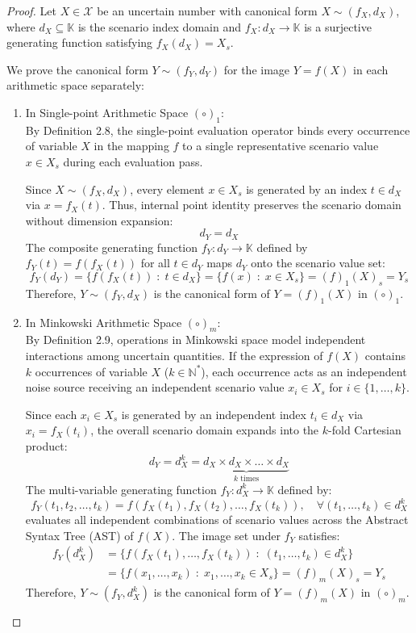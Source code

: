 \documentclass[a4paper,12pt, twoside]{memoir}
\newcommand{\kgdd}[1]{\left(#1\right)_1} %
\newcommand{\kgdt}[1]{\left(#1\right)_m} %
\begin{document}
\begin{proof}
	Let $X \in \mathcal{X}$ be an uncertain number with canonical form $X \sim (f_X, d_X)$, where $d_X \subseteq \mathbb{K}$ is the scenario index domain and $f_X: d_X \to \mathbb{K}$ is a surjective generating function satisfying $f_X(d_X) = X_s$.

	We prove the canonical form $Y \sim (f_Y, d_Y)$ for the image $Y = f(X)$ in each arithmetic space separately:

	\begin{enumerate}[leftmargin=*]
		\item In Single-point Arithmetic Space $(\circ)_1$: \\
		      By Definition 2.8, the single-point evaluation operator binds every occurrence of variable $X$ in the mapping $f$ to a single representative scenario value $x \in X_s$ during each evaluation pass.

		      Since $X \sim (f_X, d_X)$, every element $x \in X_s$ is generated by an index $t \in d_X$ via $x = f_X(t)$. Thus, internal point identity preserves the scenario domain without dimension expansion:
		      \[
			      d_Y = d_X
		      \]
		      The composite generating function $f_Y : d_Y \to \mathbb{K}$ defined by $f_Y(t) = f(f_X(t))$ for all $t \in d_Y$ maps $d_Y$ onto the scenario value set:
		      \[
			      f_Y(d_Y) = \{f(f_X(t)) \;:\; t \in d_X\} = \{f(x) \;:\; x \in X_s\} = \kgdd{f}(X)_s = Y_s
		      \]
		      Therefore, $Y \sim (f_Y, d_X)$ is the canonical form of $Y = \kgdd{f}(X)$ in $(\circ)_1$.

		\item In Minkowski Arithmetic Space $(\circ)_m$: \\
		      By Definition 2.9, operations in Minkowski space model independent interactions among uncertain quantities. If the expression of $f(X)$ contains $k$ occurrences of variable $X$ ($k \in \mathbb{N}^*$), each occurrence acts as an independent noise source receiving an independent scenario value $x_i \in X_s$ for $i \in \{1, \dots, k\}$.

		      Since each $x_i \in X_s$ is generated by an independent index $t_i \in d_X$ via $x_i = f_X(t_i)$, the overall scenario domain expands into the $k$-fold Cartesian product:
		      \[
			      d_Y = d_X^k = \underbrace{d_X \times d_X \times \dots \times d_X}_{k \text{ times}}
		      \]
		      The multi-variable generating function $f_Y : d_X^k \to \mathbb{K}$ defined by:
		      \[
			      f_Y(t_1, t_2, \dots, t_k) = f\left(f_X(t_1), f_X(t_2), \dots, f_X(t_k)\right), \quad \forall (t_1, \dots, t_k) \in d_X^k
		      \]
		      evaluates all independent combinations of scenario values across the Abstract Syntax Tree (AST) of $f(X)$. The image set under $f_Y$ satisfies:
		      \begin{align*}
			      f_Y(d_X^k) & = \{f\left(f_X(t_1), \dots, f_X(t_k)\right) \;:\; (t_1, \dots, t_k) \in d_X^k\} \\
			                 & = \{f(x_1, \dots, x_k) \;:\; x_1, \dots, x_k \in X_s\} = \kgdt{f}(X)_s = Y_s
		      \end{align*}
		      Therefore, $Y \sim (f_Y, d_X^k)$ is the canonical form of $Y = \kgdt{f}(X)$ in $(\circ)_m$.
	\end{enumerate}


\end{proof}
\end{document}
